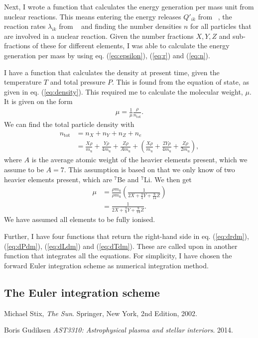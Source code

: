 \documentclass[a4paper, 11pt, english]{article}
\newcommand{\refeq}[1]{(\textcolor{red}{\ref{eq:#1}})} %
\begin{document}
Next, I wrote a function that calculates the energy generation per mass unit from nuclear
reactions. This means entering the energy releases $Q'_{ik}$ from ~\cite[p.~39,
Table~2.1]{stix}, the reaction rates $\lambda_{ik}$ from ~\cite[p.~46,
Table~2.3]{stix} and finding the number densities $n$ for all particles that are involved
in a nuclear reaction. Given the number fractions $X,Y,Z$ and sub-fractions of these
for different elements, I was able to calculate the energy generation per mass by using
eq. \refeq{epsilon}, \refeq{r} and \refeq{n}.

I have a function that calculates the density at present time, given the temperature
$T$ and total pressure $P$. This is found from the equation of state, as given in eq.
\refeq{density}. This required me to calculate the molecular weight, $\mu$. It is given on
the form
\begin{align*}
	\mu = \frac{1}{\mu}\frac{\rho}{n_{\mathrm{tot}}}.
\end{align*}
We can find the total particle density with
\begin{align*}
	n_{\mathrm{tot}} &= n_X + n_Y + n_Z + n_e \\
	&= \frac{X\rho}{m_{\mathrm{u}}} + \frac{Y\rho}{4m_{\mathrm{u}}} +
	\frac{Z\rho}{Am_{\mathrm{u}}} + \left( \frac{X\rho}{m_{\mathrm{u}}} +
	\frac{2Y\rho}{4m_{\mathrm{u}}} + \frac{Z\rho}{2m_{\mathrm{u}}} \right),
\end{align*}
where $A$ is the average atomic weight of the heavier elements present, which we assume to
be $A = 7$. This assumption is based on that we only know of two heavier elements present,
which are $^{7}\mathrm{Be}$ and $^{7}\mathrm{Li}$. We then get
\begin{align*}
	\mu &= \frac{\rho m_{\mathrm{u}}}{\rho m_{\mathrm{u}}} \left( \frac{1}{2X +
		\frac{3}{4}Y + \frac{9}{14}Z} \right) \\
		&= \frac{1}{2X +\frac{3}{4}Y + \frac{9}{14}Z}.
\end{align*}
We have assumed all elements to be fully ionised.

Further, I have four functions that return the right-hand side in eq. \refeq{drdm},
\refeq{dPdm}, \refeq{dLdm} and \refeq{dTdm}. These are called upon in another function
that integrates all the equations. For simplicity, I have chosen the forward Euler
integration scheme as numerical integration method. 

\subsection{The Euler integration scheme}


\begin{thebibliography}{9}
		Michael Stix,
		\emph{The Sun}.
		Springer, New York,
		2nd Edition,
		2002.

		Boris Gudiksen
		\emph{AST3310: Astrophysical plasma and stellar interiors}.
		2014.

\end{thebibliography}
\end{document}

